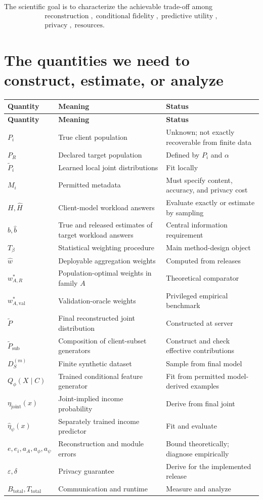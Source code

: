 \documentclass[11pt,a4paper]{article}
\begin{document}
The scientific goal is to characterize the achievable trade-off among
\[
\boxed{\begin{gathered}
\text{reconstruction}\;,\;\text{conditional fidelity}\;,\;\text{predictive utility}\;,\\
\text{privacy}\;,\;\text{resources}.
\end{gathered}}
\]

\section{The quantities we need to construct, estimate, or analyze}
\small
\begin{longtable}{@{}P{0.22\textwidth}P{0.33\textwidth}P{0.39\textwidth}@{}}
\toprule
\textbf{Quantity}&\textbf{Meaning}&\textbf{Status}\\\midrule
\endfirsthead
\toprule
\textbf{Quantity}&\textbf{Meaning}&\textbf{Status}\\\midrule
\endhead
\bottomrule\endfoot
$P_i$&True client population&Unknown; not exactly recoverable from finite data\\
$P_R$&Declared target population&Defined by $P_i$ and $\alpha$\\
$\widetilde P_i$&Learned local joint distributions&Fit locally\\
$M_i$&Permitted metadata&Must specify content, accuracy, and privacy cost\\
$H,\widehat H$&Client-model workload answers&Evaluate exactly or estimate by sampling\\
$b,\widehat b$&True and released estimates of target workload answers&Central information requirement\\
$T_\beta$&Statistical weighting procedure&Main method-design object\\
$\widehat w$&Deployable aggregation weights&Computed from releases\\
$w^*_{A,R}$&Population-optimal weights in family $A$&Theoretical comparator\\
$w^*_{A,\mathrm{val}}$&Validation-oracle weights&Privileged empirical benchmark\\
$\widetilde P$&Final reconstructed joint distribution&Constructed at server\\
$\widetilde P_{\mathrm{sub}}$&Composition of client-subset generators&Construct and check effective contributions\\
$D_S^{(m)}$&Finite synthetic dataset&Sample from final model\\
$Q_\phi(X\mid C)$&Trained conditional feature generator&Fit from permitted model-derived examples\\
$\eta_{\mathrm{joint}}(x)$&Joint-implied income probability&Derive from final joint\\
$\widehat\eta_\psi(x)$&Separately trained income predictor&Fit and evaluate\\
$e,e_i,a_A,a_\phi,a_\psi$&Reconstruction and module errors&Bound theoretically; diagnose empirically\\
$\varepsilon,\delta$&Privacy guarantee&Derive for the implemented release\\
$B_{\mathrm{total}},T_{\mathrm{total}}$&Communication and runtime&Measure and analyze\\
\end{longtable}
\end{document}
